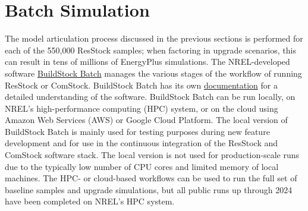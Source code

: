 \section{Batch Simulation}
The model articulation process discussed in the previous sections is performed for each of the 550,000 ResStock samples; when factoring in upgrade scenarios, this can result in tens of millions of EnergyPlus simulations. The NREL-developed software \href{https://github.com/NREL/buildstockbatch/tree/v2023.10.0}{BuildStock Batch} manages the various stages of the workflow of running ResStock or ComStock. BuildStock Batch has its own \href{https://buildstockbatch.readthedocs.io/en/v2023.10.0/index.html}{documentation} for a detailed understanding of the software. BuildStock Batch can be run locally, on NREL's high-performance computing (HPC) system, or on the cloud using Amazon Web Services (AWS) or Google Cloud Platform. The local version of BuildStock Batch is mainly used for testing purposes during new feature development and for use in the continuous integration of the ResStock and ComStock software stack. The local version is not used for production-scale runs due to the typically low number of CPU cores and limited memory of local machines. The HPC- or cloud-based workflows can be used to run the full set of baseline samples and upgrade simulations, but all public runs up through 2024 have been completed on NREL's HPC system.

